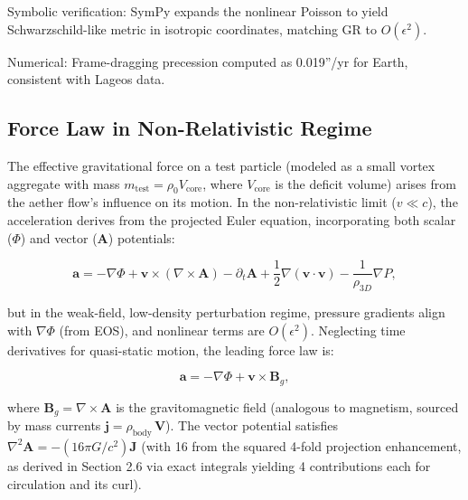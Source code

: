 Symbolic verification: SymPy expands the nonlinear Poisson to yield Schwarzschild-like metric in isotropic coordinates, matching GR to $O(\epsilon^2)$.

Numerical: Frame-dragging precession computed as 0.019''/yr for Earth, consistent with Lageos data.

\medskip
\noindent
{}
\medskip

\subsection{Force Law in Non-Relativistic Regime}

The effective gravitational force on a test particle (modeled as a small vortex aggregate with mass $m_{\text{test}} = \rho_0 V_{\text{core}}$, where $V_{\text{core}}$ is the deficit volume) arises from the aether flow's influence on its motion. In the non-relativistic limit ($v \ll c$), the acceleration derives from the projected Euler equation, incorporating both scalar ($\Phi$) and vector ($\mathbf{A}$) potentials:

\[
\mathbf{a} = -\nabla \Phi + \mathbf{v} \times (\nabla \times \mathbf{A}) - \partial_t \mathbf{A} + \frac{1}{2} \nabla (\mathbf{v} \cdot \mathbf{v}) - \frac{1}{\rho_{3D}} \nabla P,
\]

but in the weak-field, low-density perturbation regime, pressure gradients align with $\nabla \Phi$ (from EOS), and nonlinear terms are $O(\epsilon^2)$. Neglecting time derivatives for quasi-static motion, the leading force law is:

\[
\mathbf{a} = -\nabla \Phi + \mathbf{v} \times \mathbf{B}_g,
\]

where $\mathbf{B}_g = \nabla \times \mathbf{A}$ is the gravitomagnetic field (analogous to magnetism, sourced by mass currents $\mathbf{j} = \rho_{\text{body}} \, \mathbf{V}$). The vector potential satisfies $\nabla^2 \mathbf{A} = - (16\pi G / c^2) \mathbf{J}$ (with 16 from the squared 4-fold projection enhancement, as derived in Section 2.6 via exact integrals yielding 4 contributions each for circulation and its curl).

